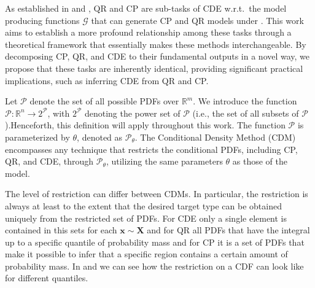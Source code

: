 As established in  and , QR and CP are sub-tasks of CDE w.r.t.\ the model producing functions $\mathcal{G}$ that can generate CP and QR models under . This work aims to establish a more profound relationship among these tasks through a theoretical framework that essentially makes these methods interchangeable. By decomposing CP, QR, and CDE to their fundamental outputs in a novel way, we propose that these tasks are inherently identical, providing significant practical implications, such as inferring CDE from QR and CP.\@

Let $\mathcal{P}$ denote the set of all possible PDFs over $\mathbb{R}^m$. We introduce the function $\mathscr{P}: \mathbb{R}^n \rightarrow 2^{\mathcal{P}}$, with $2^{\mathcal{P}}$ denoting the power set of $\mathcal{P}$ (i.e., the set of all subsets of $\mathcal{P}$).Henceforth, this definition will apply throughout this work. The function $\mathscr{P}$ is parameterized by $\theta$, denoted as $\mathscr{P}_\theta$. The Conditional Density Method (CDM) encompasses any technique that restricts the conditional PDFs, including CP, QR, and CDE, through $\mathscr{P}_\theta$, utilizing the same parameters $\theta$ as those of the model.

The level of restriction can differ between CDMs. In particular, the restriction is always at least to the extent that the desired target type can be obtained uniquely from the restricted set of PDFs. For CDE only a single element is contained in this sets for each $\mathbf{x} \sim \mathbf{X}$ and for QR all PDFs that have the integral up to a specific quantile of probability mass and for CP it is a set of PDFs that make it possible to infer that a specific region contains a certain amount of probability mass. In  and  we can see how the restriction on a CDF can look like for different quantiles.

